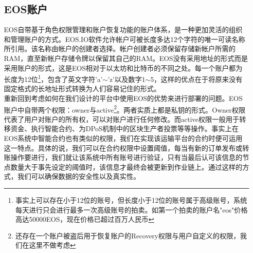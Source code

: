 \documentclass[UTF8]{ctexart}
\begin{document}
\begin{multicols}{2}
  \subsection{EOS账户}
  EOS自带基于角色权限管理和账户恢复功能的账户体系，是一种更加灵活的组织和管理账户的方式。EOS.IO软件允许帐户可被长度多达12个字符的唯一可读名称所引用。该名称由帐户的创建者选择。帐户创建者必须保留存储新帐户所需的RAM，直至新帐户存储令牌以保留其自己的RAM\cite{ref4}。EOS没有采用地址的形式而是采用账户的形式，这是EOS相对于以太坊和比特币的不同之处。每一个账户都为长度为12位\footnote[1]{事实上可以存在小于12位的账号，但长度小于12位的账号属于高级账号，系统每天进行只会进行最多一次高级账号的拍卖。如第一个拍卖的账户名"eos"价格高达50000EOS，现在价格已超过百万人民币}，包含了英文字符'a'$\sim$'z'以及数字1$\sim$5，这样的优点在于将原来没有固定格式的长地址形式转换为人们容易记住的形式。\\
  \indent 重新回到考虑如何在我们设计的平台中使用EOS的优势来进行部署的问题。EOS账户中自带两个权限：owner与active\footnote[2]{还存在一个账户被盗后用于恢复账户的Recovery权限与用户自定义的权限，我们在这里不做考虑}。两者实质上都是私钥的形式。Owner权限代表了用户对账户的所有权，可以对账户进行任何修改。而active权限一般用于转移资金、执行智能合约、为DPoS机制中的区块生产者投票等等操作。事实上在EOS系统中智能合约也有类似的权限，我们在实现该运输平台的合约时便可运用这一特点。具体的说，我们可以在合约权限中设置阈值，每当有新的订单发布或转账操作要进行，我们就让该系统中所有账号进行验证，只有当最后认可该信息的节点数量大于事先设定的阈值时，该信息才最终会被更新到作业链上。通过这样的方式，我们可以确保数据的安全性以及真实性。\\

\end{multicols}
\end{document}
